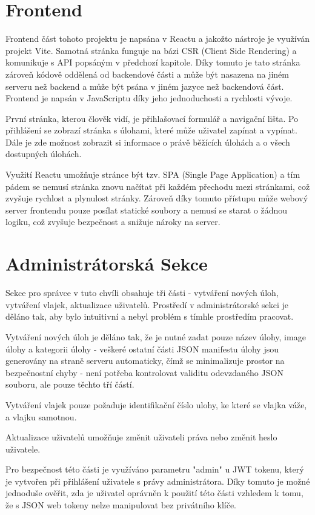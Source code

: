 \documentclass[12pt, a4paper,
twoside,        %
openright
]{report}
\begin{document}
\chapter{Frontend}
Frontend část tohoto projektu je napsána v Reactu a jakožto nástroje je využíván projekt Vite. Samotná stránka funguje na bázi CSR (Client Side Rendering) a komunikuje s API popsáným v předchozí kapitole. Díky tomuto je tato stránka zároveň kódově oddělená od backendové části a může být nasazena na jiném serveru než backend a může být psána v jiném jazyce než backendová část. Frontend je napsán v JavaScriptu díky jeho jednoduchosti a rychlosti vývoje.

První stránka, kterou člověk vidí, je přihlašovací formulář a navigační lišta. Po přihlášení se zobrazí stránka s úlohami, které může uživatel zapínat a vypínat. Dále je zde možnost zobrazit si informace o právě běžících úlohách a o všech dostupných úlohách.

Využití Reactu umožňuje stránce být tzv. SPA (Single Page Application) a tím pádem se nemusí stránka znovu načítat při každém přechodu mezi stránkami, což zvyšuje rychlost a plynulost stránky. Zároveň díky tomuto přístupu může webový server frontendu pouze posílat statické soubory a nemusí se starat o žádnou logiku, což zvyšuje bezpečnost a snižuje nároky na server.

\chapter{Administrátorská Sekce}
Sekce pro správce v tuto chvíli obsahuje tři části - vytváření nových úloh, vytváření vlajek, aktualizace uživatelů. Prostředí v administrátorské sekci je děláno tak, aby bylo intuitivní a nebyl problém s tímhle prostředím pracovat. 

Vytváření nových úloh je děláno tak, že je nutné zadat pouze název úlohy, image úlohy a kategorii úlohy - veškeré ostatní části JSON manifestu úlohy jsou generovány na straně serveru automaticky, čímž se minimalizuje prostor na bezpečnostní chyby - není potřeba kontrolovat validitu odevzdaného JSON souboru, ale pouze těchto tří částí. 

Vytváření vlajek pouze požaduje identifikační číslo ulohy, ke které se vlajka váže, a vlajku samotnou.

Aktualizace uživatelů umožňuje změnit uživateli práva nebo změnit heslo uživatele.

Pro bezpečnost této části je využíváno parametru "admin" u JWT tokenu, který je vytvořen při přihlášení uživatele s právy administrátora. Díky tomuto je možné jednoduše ověřit, zda je uživatel oprávněn k použití této části vzhledem k tomu, že s JSON web tokeny nelze manipulovat bez privátního klíče.
\end{document}
